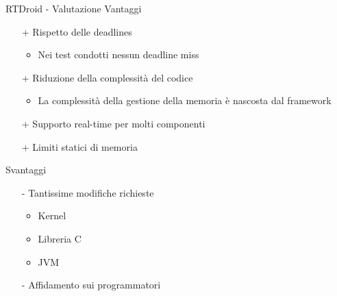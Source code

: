 \begin{frame}{RTDroid - Valutazione}
	Vantaggi
	\begin{itemize}
		\item[+] Rispetto delle deadlines
		\begin{itemize}
			\item Nei test condotti nessun deadline miss
		\end{itemize}
		\item[+] Riduzione della complessità del codice
		\begin{itemize}
			\item La complessità della gestione della memoria è nascosta dal framework
		\end{itemize}
		\item[+] Supporto real-time per molti componenti
		\item[+] Limiti statici di memoria
	\end{itemize}
	\vspace{5px}
	Svantaggi
	\begin{itemize}
		\item[-] Tantissime modifiche richieste
		\begin{itemize}
			\item Kernel
			\item Libreria C
			\item JVM
		\end{itemize}
		\item[-] Affidamento sui programmatori
	\end{itemize}
\end{frame}